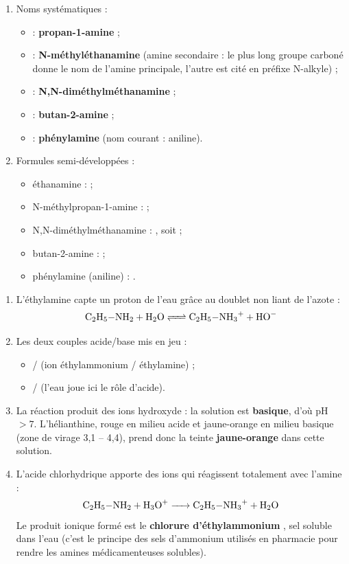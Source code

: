 \documentclass[11pt]{article}
\begin{document}
\begin{corrige}
\begin{enumerate}
\item Noms systématiques :
\begin{itemize}
\item {} : \textbf{propan-1-amine} ;
\item {} : \textbf{N-méthyléthanamine} (amine secondaire : le plus long groupe carboné donne le nom de l'amine principale, l'autre est cité en préfixe N-alkyle) ;
\item {} : \textbf{N,N-diméthylméthanamine} ;
\item {} : \textbf{butan-2-amine} ;
\item {} : \textbf{phénylamine} (nom courant : aniline).
\end{itemize}
\item Formules semi-développées :
\begin{itemize}
\item éthanamine :  ;
\item N-méthylpropan-1-amine :  ;
\item N,N-diméthylméthanamine : , soit  ;
\item butan-2-amine :  ;
\item phénylamine (aniline) : .
\end{itemize}
\end{enumerate}
\end{corrige}

\begin{corrige}
\begin{enumerate}
\item L'éthylamine capte un proton de l'eau grâce au doublet non liant de l'azote :
\[ \ce{C2H5-NH2 + H2O <=> C2H5-NH3+ + HO-} \]
\item Les deux couples acide/base mis en jeu :
\begin{itemize}
\item {}/ (ion éthylammonium / éthylamine) ;
\item {}/ (l'eau joue ici le rôle d'acide).
\end{itemize}
\item La réaction produit des ions hydroxyde  : la solution est \textbf{basique}, d'où pH $> 7$. L'hélianthine, rouge en milieu acide et jaune-orange en milieu basique (zone de virage 3,1 -- 4,4), prend donc la teinte \textbf{jaune-orange} dans cette solution.
\item L'acide chlorhydrique apporte des ions  qui réagissent totalement avec l'amine :
\[ \ce{C2H5-NH2 + H3O+ -> C2H5-NH3+ + H2O} \]
Le produit ionique formé est le \textbf{chlorure d'éthylammonium} , sel soluble dans l'eau (c'est le principe des sels d'ammonium utilisés en pharmacie pour rendre les amines médicamenteuses solubles).
\end{enumerate}
\end{corrige}
\end{document}
